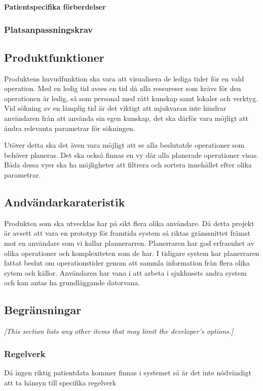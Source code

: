 \documentclass{article}
\begin{document}
\begin{enumerate}
\textbf{Patientspecifika förberdelser}\\

\subsubsection{Platsanpassningskrav}
\label{subsec:Platsanpassningskrav}
\subsection{Produktfunktioner}
\label{subsec:Produktfunktioner}
Produktens huvudfunktion ska vara att visualisera de lediga tider för en vald
operation. Med en ledig tid avses en tid då alla ressureser som krävs för den
operationen är ledig, så som personal med rätt kunskap samt lokaler och verktyg.
Vid sökning av en lämplig tid är det viktigt att mjukvaran inte hindrar
användaren från att använda sin egen kunskap, det ska därför vara möjligt att
ändra relevanta parametrar för sökningen.

Utöver detta ska det även vara möjligt att se alla beslutatde operationer som
behöver planeras. Det ska också finnas en vy där alla planerade operationer
visas. Båda dessa vyer ska ha möjligheter att filtrera och sortera innehållet
efter olika parametrar.
\subsection{Andvändarkarateristik}
\label{subsec:Andvandarkarateristik}
Produkten som ska utvecklas har på sikt flera olika användare. Då detta
projekt är avsett att vara en prototyp för framtida system så riktas gränssnittet
främst mot en användare som vi kallar plannerarren. Planerraren har god
erfraenhet av olika operationer och komplexiteten som de har. I tidigare system
har planerraren fattat beslut om operationstider genom att sammla information
från flera olika sytem och källor. Användaren har vana i att arbeta i sjukhusets
andra system och kan antas ha grundläggande datorvana.

\subsection{Begränsningar}
\label{subsec:Begransningar}
\emph{[This section lists any other items that may limit the developer's
  options.]}


\subsubsection{Regelverk}
\label{subsec:Regelverk}
Då ingen riktig patientdata kommer finnas i systemet så är det inte nödvändigt
att ta hänsyn till specifika regelverk

\end{enumerate}
\end{document}

